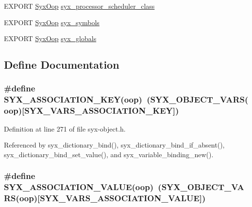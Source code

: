 \begin{CompactItemize}
\item 
EXPORT \hyperlink{syx-types_8h_1121caba2d40b2ce090b640762744ccd}{SyxOop} \hyperlink{syx-object_8h_36a21dfe0c7f34b3f935ff11a48b6c0c}{syx\_\-processor\_\-scheduler\_\-class}
\item 
EXPORT \hyperlink{syx-types_8h_1121caba2d40b2ce090b640762744ccd}{SyxOop} \hyperlink{syx-object_8h_f0e4dafb84c01e0dcd5a7bc7b800594e}{syx\_\-symbols}
\item 
EXPORT \hyperlink{syx-types_8h_1121caba2d40b2ce090b640762744ccd}{SyxOop} \hyperlink{syx-object_8h_c285844af2007d5ac653de1a0dfb7524}{syx\_\-globals}
\end{CompactItemize}


\subsection{Define Documentation}
\hypertarget{syx-object_8h_96eb58398db62043c949d60b43a640d3}{
\subsubsection{\setlength{\rightskip}{0pt plus 5cm}\#define SYX\_\-ASSOCIATION\_\-KEY(oop)~(SYX\_\-OBJECT\_\-VARS(oop)\mbox{[}SYX\_\-VARS\_\-ASSOCIATION\_\-KEY\mbox{]})}}
\label{syx-object_8h_96eb58398db62043c949d60b43a640d3}




Definition at line 271 of file syx-object.h.

Referenced by syx\_\-dictionary\_\-bind(), syx\_\-dictionary\_\-bind\_\-if\_\-absent(), syx\_\-dictionary\_\-bind\_\-set\_\-value(), and syx\_\-variable\_\-binding\_\-new().\hypertarget{syx-object_8h_30f472220bcb98f2882f5ad89bd7480e}{
\subsubsection{\setlength{\rightskip}{0pt plus 5cm}\#define SYX\_\-ASSOCIATION\_\-VALUE(oop)~(SYX\_\-OBJECT\_\-VARS(oop)\mbox{[}SYX\_\-VARS\_\-ASSOCIATION\_\-VALUE\mbox{]})}}
\label{syx-object_8h_30f472220bcb98f2882f5ad89bd7480e}




